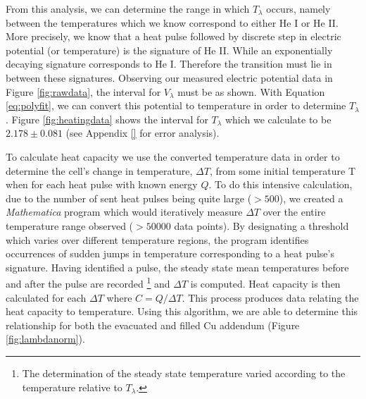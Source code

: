 From this analysis, we can determine the range in which $T_{\lambda}$ occurs, namely between the temperatures which we know correspond to either He I or He II.  More precisely, we know that a heat pulse followed by discrete step in electric potential (or temperature) is the signature of He II.  While an exponentially decaying signature corresponds to He I. Therefore the transition must lie in between these signatures.  Observing our measured electric potential data in Figure \ref{fig:rawdata}, the interval for $V_{\lambda}$ must be as shown.  With Equation \ref{eq:polyfit}, we can convert this potential to temperature in order to determine $T_{\lambda}$.  Figure \ref{fig:heatingdata} shows the interval for $T_{\lambda}$ which we calculate to be $2.178\pm0.081$ (see Appendix \ref{} for error analysis). 

To calculate heat capacity we use the converted temperature data in order to determine the cell's change in temperature, $\Delta T$, from some initial temperature T when for each heat pulse with known energy $Q$.  To do this intensive calculation, due to the number of sent heat pulses being quite large ($>500$), we created a \emph{Mathematica} program which would iteratively measure $\Delta T$ over the entire temperature range observed ($>50000$ data points).  By designating a threshold which varies over different temperature regions, the program identifies occurrences of sudden jumps in temperature corresponding to a heat pulse's signature. Having identified a pulse, the steady state mean temperatures before and after the pulse are recorded \footnote{The determination of the steady state temperature varied according to the temperature relative to $T_{\lambda}$.} and $\Delta T$ is computed.  Heat capacity is then calculated for each $\Delta T$ where $C=Q/\Delta T$.  This process produces data relating the heat capacity to temperature.  Using this algorithm, we are able to determine this relationship for both the evacuated and filled Cu addendum (Figure \ref{fig:lambdanorm}).


